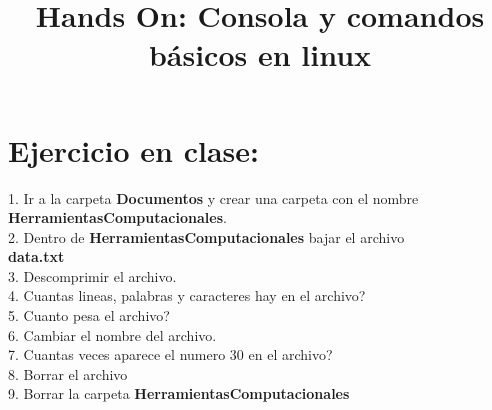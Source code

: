 \documentclass{article}
\title{Hands On: Consola y comandos b\'asicos en linux}
\begin{document}
\maketitle

\section{Ejercicio en clase:}

1. Ir a la carpeta \textbf{Documentos} y crear una carpeta con el nombre \textbf{HerramientasComputacionales}.\\
2. Dentro de \textbf{HerramientasComputacionales} bajar el archivo\\ \textbf{data.txt}\\
3. Descomprimir el archivo.\\
4. Cuantas lineas, palabras y caracteres hay en el archivo?\\
5. Cuanto pesa el archivo?	\\
6. Cambiar el nombre del archivo.\\
7. Cuantas veces aparece el numero 30 en el archivo?\\
8. Borrar el archivo\\
9. Borrar la carpeta \textbf{HerramientasComputacionales}
\end{document}
